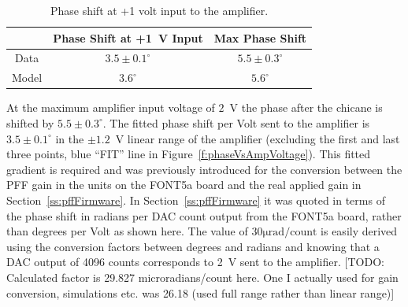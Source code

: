 \begin{table}
  \begin{center}
    \begin{tabular}{| c | c | c |}
	   \hline
        & Phase Shift at +1~V Input & Max Phase Shift \\ \hline
       Data & \(3.5\pm0.1^\circ\) & \(5.5\pm0.3^\circ\) \\
	   Model & \(3.6^\circ\) & \(5.6^\circ\) \\
 	   \hline
    \end{tabular}
    \caption{Phase shift at +1 volt input to the amplifier.}
  	\label{t:PhaseVsDAC}
  \end{center}
\end{table}

At the maximum amplifier input voltage of \(2\)~V the phase after the chicane is shifted by \(5.5\pm0.3^\circ\). The fitted phase shift per Volt sent to the amplifier is \(3.5\pm0.1^\circ\) in the \(\pm1.2\)~V linear range of the amplifier (excluding the first and last three points, blue ``FIT'' line in Figure~\ref{f:phaseVsAmpVoltage}). This fitted gradient is required and was previously introduced for the conversion between the PFF gain in the units on the FONT5a board and the real applied gain in Section~\ref{ss:pffFirmware}. In Section~\ref{ss:pffFirmware} it was quoted in terms of the phase shift in radians per DAC count output from the FONT5a board, rather than degrees per Volt as shown here. The value of \(30\mathrm{\mu rad/count}\) is easily derived using the conversion factors between degrees and radians and knowing that a DAC output of 4096 counts corresponds to 2~V sent to the amplifier.
[TODO: Calculated factor is 29.827 microradians/count here. One I actually used for gain conversion, simulations etc. was 26.18 (used full range rather than linear range)]


